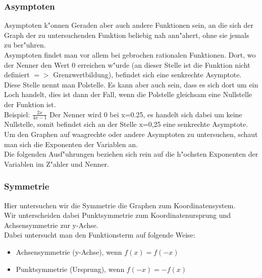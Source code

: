 \subsubsection{Asymptoten}
 Asymptoten k"onnen Geraden aber auch andere Funktionen sein, an die sich der Graph der zu untersuchenden Funktion beliebig nah ann"ahert, ohne sie jemals zu ber"uhren.\\
 Asymptoten findet man vor allem bei gebrochen rationalen Funktionen. Dort, wo der Nenner den Wert 0 erreichen w"urde (an dieser Stelle ist die Funktion nicht definiert $=>$ Grenzwertbildung), befindet sich eine senkrechte Asymptote. Diese Stelle nennt man Polstelle. Es kann aber auch sein, dass es sich dort um ein Loch handelt, dies ist dann der Fall, wenn die Polstelle gleichsam eine Nullstelle der Funktion ist.\\
 Beispiel: $\frac{2x}{4x-1}$ Der Nenner wird 0 bei x=0.25, es handelt sich dabei um keine Nullstelle, somit befindet sich an der Stelle x=0,25 eine senkrechte Asymptote.\\
 Um den Graphen auf waagrechte oder andere Asymptoten zu untersuchen, schaut man sich die Exponenten der Variablen an.\\
 Die folgenden Ausf"uhrungen beziehen sich rein auf die h"ochsten Exponenten der Variablen im Z"ahler und Nenner.
 \subsubsection{Symmetrie}
 Hier untersuchen wir die Symmetrie die Graphen zum Koordinatensystem.\\
 Wir unterscheiden dabei Punktsymmetrie zum Koordinatenursprung und Achsensymmetrie zur y-Achse.\\
 Dabei untersucht man den Funktionsterm auf folgende Weise:
 \begin{itemize}
 \item Achsensymmetrie (y-Achse), wenn $f(x)=f(-x)$
 \item Punktsymmetrie (Ursprung), wenn $f(-x)=-f(x)$
 \end{itemize}
